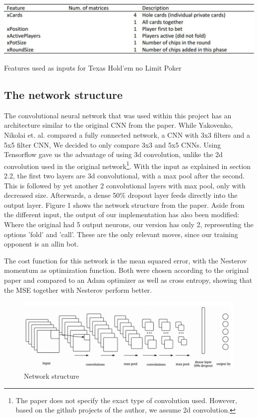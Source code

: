 \documentclass[]{report}
\begin{document}
\begin{table}
\includegraphics[scale=0.5]{Features.JPG}

\caption{Features used as inputs for Texas Hold'em no Limit Poker \label{tab:tensor}}

\end{table}
\subsection{The network structure}

The convolutional neural network that was used within this project has an architecture similar to the original CNN from the paper\cite{1}. While Yakovenko, Nikolai et. al. compared a fully connected network, a CNN with 3x3 filters and a 5x5 filter CNN, We decided to only compare 3x3 and 5x5 CNNs. Using Tensorflow gave us the advantage of using 3d convolution, unlike the 2d convolution used in the original network\footnote{The paper does not specify the exact type of convolution used. However, based on the github projects of the author, we assume 2d convolution.}. With the input as explained in section 2.2, the first two layers are 3d convolutional, with a max pool after the second. This is followed by yet another 2 convolutional layers with max pool, only with decreased size. 
Afterwards, a dense 50\% dropout layer feeds directly into the output layer. Figure 1 shows the network structure from the paper. Aside from the different input, the output of our implementation has also been modified: Where the original had 5 output neurons, our version has only 2, representing the options 'fold' and 'call'. These are the only relevant moves, since our training opponent is an allin bot.

The cost function for this network is the mean squared error, with the Nesterov momentum as optimization function. Both were chosen according to the original paper and compared to an Adam optimizer as well as cross entropy, showing that the MSE together with Nesterov perform better.


\begin{figure}[h]
	\caption{Network structure}
	\includegraphics[scale = 0.5]{cnn_structure.jpg}
\end{figure} 
\end{document}
